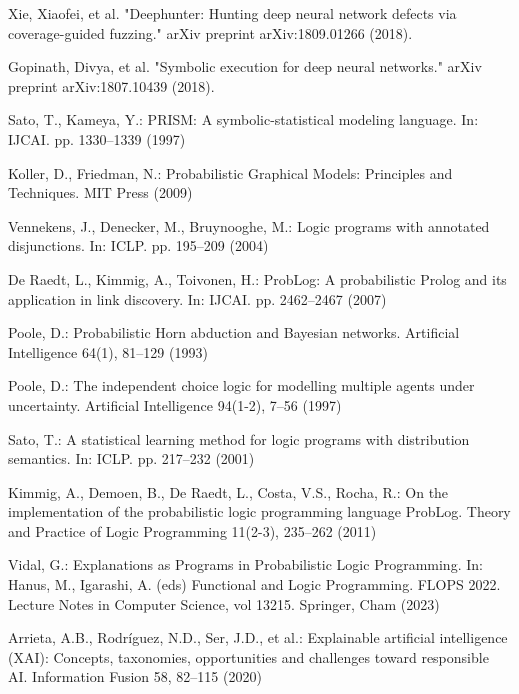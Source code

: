 \begin{singlespace}
\begin{thebibliography}{}
 Xie, Xiaofei, et al. "Deephunter: Hunting deep neural network defects via coverage-guided fuzzing." arXiv preprint arXiv:1809.01266 (2018).

	Gopinath, Divya, et al. "Symbolic execution for deep neural networks." arXiv preprint arXiv:1807.10439 (2018).


 Sato, T., Kameya, Y.: PRISM: A symbolic-statistical modeling language. In: IJCAI. pp. 1330--1339 (1997)

 Koller, D., Friedman, N.: Probabilistic Graphical Models: Principles and Techniques. MIT Press (2009)

 Vennekens, J., Denecker, M., Bruynooghe, M.: Logic programs with annotated disjunctions. In: ICLP. pp. 195--209 (2004)

 De Raedt, L., Kimmig, A., Toivonen, H.: ProbLog: A probabilistic Prolog and its application in link discovery. In: IJCAI. pp. 2462--2467 (2007)

 Poole, D.: Probabilistic Horn abduction and Bayesian networks. Artificial Intelligence 64(1), 81--129 (1993)

 Poole, D.: The independent choice logic for modelling multiple agents under uncertainty. Artificial Intelligence 94(1-2), 7--56 (1997)

 Sato, T.: A statistical learning method for logic programs with distribution semantics. In: ICLP. pp. 217--232 (2001)

 Kimmig, A., Demoen, B., De Raedt, L., Costa, V.S., Rocha, R.: On the implementation of the probabilistic logic programming language ProbLog. Theory and Practice of Logic Programming 11(2-3), 235--262 (2011)

 Vidal, G.: Explanations as Programs in Probabilistic Logic Programming. In: Hanus, M., Igarashi, A. (eds) Functional and Logic Programming. FLOPS 2022. Lecture Notes in Computer Science, vol 13215. Springer, Cham (2023)

 Arrieta, A.B., Rodríguez, N.D., Ser, J.D., et al.: Explainable artificial intelligence (XAI): Concepts, taxonomies, opportunities and challenges toward responsible AI. Information Fusion 58, 82--115 (2020)

\end{thebibliography}

\end{singlespace}
